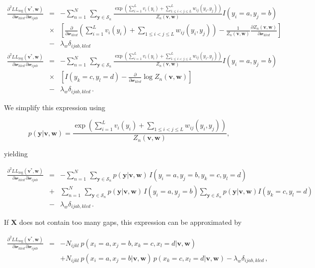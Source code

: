 \documentclass[12pt,a4paper,twoside]{book}
\newcommand{\eq}{\!=\!}
\newcommand{\LLreg}{L\!L_\mathrm{reg}}
\newcommand{\Sn}{\mathcal{S}_n}
\renewcommand{\v}{\mathbf{v}}
\newcommand{\w}{\mathbf{w}}
\newcommand{\wijab}{\mathcal{w}_{ijab}}
\newcommand{\wklcd}{\mathcal{w}_{klcd}}
\newcommand{\X}{\mathbf{X}}
\theoremstyle{definition}
\theoremstyle{definition}
\theoremstyle{remark}
\begin{document}
\begin{eqnarray}
    \frac{\partial^2 \LLreg(\v^*,\w)}{\partial \wklcd \, \partial \wijab  } 
    &=&  - \sum_{n=1}^{N} \, \sum_{\mathbf{y} \in \Sn} \frac{\exp \left(\sum_{i=1}^L v_i(y_i) + \sum_{1 \le i < j \le L}^L w_{ij}(y_i,y_j)  \right)}{Z_n(\v,\w)}  I(y_i \eq a, y_j \eq b) \\
    & \times & \left[ \frac{\partial}{\partial \wklcd} \left( \sum_{i=1}^L v_i(y_i) + \sum_{1 \le i < j \le L}  w_{ij}(y_i,y_j)  \right) 
                  - \frac{1}{Z_n(\v,\w)} \frac{\partial  Z_n(\v,\w) }{\partial\wklcd} \right] \\
    &-& \lambda_w \delta_{ijab,klcd} \\
    \frac{\partial^2 \LLreg(\v^*,\w)}{\partial \wklcd \, \partial \wijab  } 
    &=&  - \sum_{n=1}^{N} \, \sum_{\mathbf{y} \in \Sn} \frac{\exp \left(\sum_{i=1}^L v_i(y_i) + \sum_{1 \le i < j \le L}^L w_{ij}(y_i,y_j)  \right)}{Z_n(\v,\w)}  I(y_i \eq a, y_j \eq b) \\
    & \times & \left[ I(y_k \eq c, y_l \eq d) - \frac{\partial}{\partial \wklcd} \log Z_n(\v,\w) \right] \\
    &-& \lambda_w \delta_{ijab,klcd} \,.
\end{eqnarray}

We simplify this expression using

\begin{equation}
    p(\mathbf{y} | \v,\w) = \frac{\exp \left( \sum_{i=1}^L v_i(y_i) + \sum_{1 \le i < j \le L} w_{ij}(y_i,y_j) \right)}{Z_n(\v,\w)}  ,
\end{equation}

yielding

\begin{eqnarray}
    \frac{\partial^2 \LLreg(\v^*,\w)}{\partial \wklcd \, \partial \wijab} 
    &=&  -  \sum_{n=1}^{N} \, \sum_{\mathbf{y} \in \Sn} p(\mathbf{y} | \v,\w) \, I(y_i \eq a, y_j \eq b, y_k \eq c, y_l \eq d)  \\
    &+& \sum_{n=1}^{N} \, \sum_{\mathbf{y} \in \mathcal{S}_n} p(\mathbf{y} | \v,\w) \, I(y_i \eq a, y_j \eq b ) \sum_{\mathbf{y} \in \Sn} p(\mathbf{y} | \v,\w)  I(y_k \eq c, y_l \eq d ) \\
    &-& \lambda_w \delta_{ijab,klcd} \,.
\end{eqnarray}

If \(\X\) does not contain too many gaps, this expression can be
approximated by

\begin{eqnarray}
    \frac{\partial^2 \LLreg(\v^*,\w)}{\partial \wklcd \, \partial \wijab  } 
    &=& - N_{ijkl} \: p(x_i \eq a, x_j \eq b, x_k \eq c, x_l \eq d | \v,\w)  \nonumber \\
    && +  N_{ijkl} \: p(x_i \eq a, x_j \eq b | \v,\w) \, p(x_k \eq c, x_l \eq d | \v,\w) - \lambda_w \delta_{ijab,klcd} \,,
\end{eqnarray}
\end{document}
